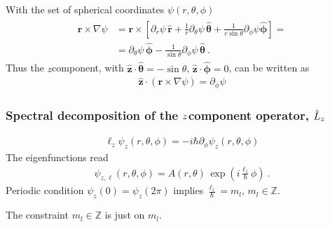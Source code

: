 \documentclass[letterpaper,10pt,english]{jupyterBook}
\begin{document}
\sphinxAtStartPar
With the set of spherical coordinates \(\psi(r,\theta,\phi)\)
\begin{equation*}
\begin{split}\begin{aligned}
  \mathbf{r} \times \nabla \psi 
  & = \mathbf{r} \times \left[ \partial_r \psi \, \hat{\mathbf{r}}  + \frac{1}{r} \partial_\theta \psi \, \hat{\boldsymbol\theta} + \frac{1}{r \sin \theta} \partial_{\phi} \psi \hat{\boldsymbol\phi} \right] = \\
  & = \partial_\theta \psi \, \hat{\boldsymbol\phi} - \frac{1}{\sin \theta} \partial_\phi \psi \, \hat{\boldsymbol\theta} \ .
\end{aligned}\end{split}
\end{equation*}
\sphinxAtStartPar
Thus the \(z\)\sphinxhyphen{}component, with \(\hat{\mathbf{z}} \cdot \hat{\boldsymbol{\theta}} = - \sin \theta\), \(\hat{\mathbf{z}} \cdot \hat{\boldsymbol\phi} = 0\), can be written as
\begin{equation*}
\begin{split}\hat{\mathbf{z}} \cdot \left( \mathbf{r} \times \nabla \psi \right) = \partial_\phi \psi\end{split}
\end{equation*}\subsubsection*{Spectral decomposition of the \protect\(z\protect\)\sphinxhyphen{}component operator, \protect\(\hat{L}_z\protect\)}
\begin{equation*}
\begin{split}\ell_z \psi_z(r,\theta,\phi) = -i \hbar \partial_\phi \psi_z(r,\theta,\phi)\end{split}
\end{equation*}
\sphinxAtStartPar
The eigenfunctions read
\begin{equation*}
\begin{split}\psi_{z,\ell}(r,\theta,\phi) = A(r,\theta) \, \exp\left( i \frac{\ell_z}{\hbar} \phi \right) \ .\end{split}
\end{equation*}
\sphinxAtStartPar
Periodic condition \(\psi_z(0) = \psi_z(2 \pi)\) implies \(\frac{\ell_z}{\hbar} = m_l\), \(m_l \in \mathbb{Z}\).

\sphinxAtStartPar
{} The constraint \(m_l \in \mathbb{Z}\) is just  on \(m_l\).
\end{document}
